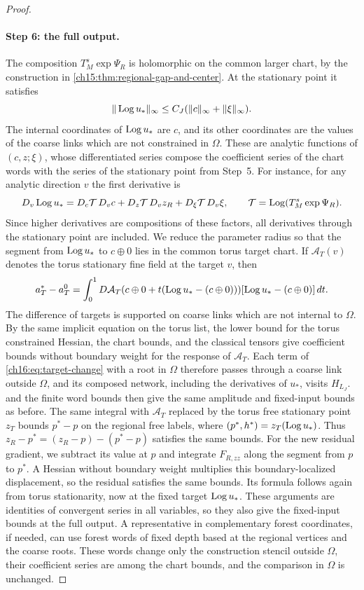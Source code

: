 \begin{proof}
\paragraph{Step 6: the full output.}
The composition $T_M^s\exp\Psi_R$ is holomorphic on the common larger chart, by the construction in \cref{ch15:thm:regional-gap-and-center}. At the stationary point it satisfies
\[
 \|\operatorname{Log} u_*\|_\infty\le C_J(\|c\|_\infty+\|\xi\|_\infty).
\]
The internal coordinates of $\operatorname{Log} u_*$ are $c$, and its other coordinates are the values of the coarse links which are not constrained in $\Omega$. These are analytic functions of $(c,z;\xi)$, whose differentiated series compose the coefficient series of the chart words with the series of the stationary point from Step~5. For instance, for any analytic direction $v$ the first derivative is
\[
 D_v\operatorname{Log} u_*=D_c\mathcal T\,D_vc
              +D_z\mathcal T\,D_vz_R+D_\xi\mathcal T\,D_v\xi,
 \qquad \mathcal T=\operatorname{Log}(T_M^s\exp\Psi_R).
\]
Since higher derivatives are compositions of these factors, all derivatives through the stationary point are included. We reduce the parameter radius so that the segment from $\operatorname{Log} u_*$ to $c\oplus0$ lies in the common torus target chart. If $\mathcal A_T(v)$ denotes the torus stationary fine field at the target $v$, then
\begin{equation}\label{ch16:eq:target-change}
 a_T^*-a_T^0=\int_0^1
 D\mathcal A_T(c\oplus0+t(\operatorname{Log} u_*-(c\oplus0)))
                      [\operatorname{Log} u_*-(c\oplus0)]\,dt.
\end{equation}
The difference of targets is supported on coarse links which are not internal to $\Omega$. By the same implicit equation on the torus list, the lower bound for the torus constrained Hessian, the chart bounds, and the classical tensors give coefficient bounds without boundary weight for the response of $\mathcal A_T$. Each term of \eqref{ch16:eq:target-change} with a root in $\Omega$ therefore passes through a coarse link outside $\Omega$, and its composed network, including the derivatives of $u_*$, visits $H_{L_J}$.  and the finite word bounds then give the same amplitude and fixed-input bounds as before. The same integral with $\mathcal A_T$ replaced by the torus free stationary point $z_T$ bounds $p^*-p$ on the regional free labels, where $(p^*,h^*)=z_T(\operatorname{Log} u_*)$. Thus $z_R-p^*=(z_R-p)-(p^*-p)$ satisfies the same bounds. For the new residual gradient, we subtract its value at $p$ and integrate $F_{R,zz}$ along the segment from $p$ to $p^*$. A Hessian without boundary weight multiplies this boundary-localized displacement, so the residual satisfies the same bounds. Its formula follows again from torus stationarity, now at the fixed target $\operatorname{Log} u_*$. These arguments are identities of convergent series in all variables, so they also give the fixed-input bounds at the full output. A representative in complementary forest coordinates, if needed, can use forest words of fixed depth based at the regional vertices and the coarse roots. These words change only the construction stencil outside $\Omega$, their coefficient series are among the chart bounds, and the comparison in $\Omega$ is unchanged.


\end{proof}

